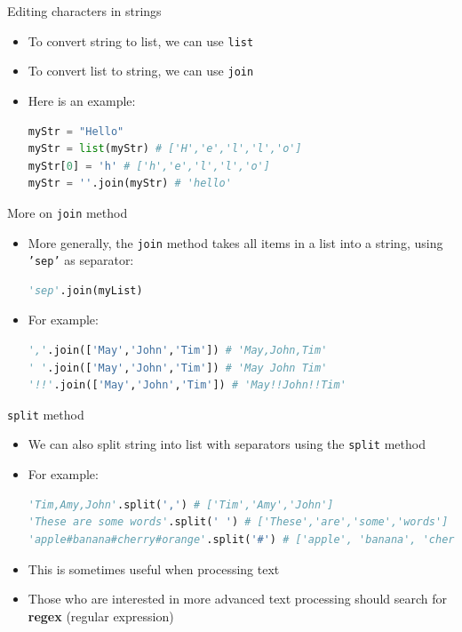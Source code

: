\documentclass[10pt,xcolor={table,dvipsnames},t]{beamer}
\begin{document}
\begin{frame}[fragile]{Editing characters in strings}
  \begin{itemize}
    \item To convert string to list, we can use \texttt{list}
    \item To convert list to string, we can use \texttt{join}
    \item Here is an example:
\begin{lstlisting}[language=python]
myStr = "Hello"
myStr = list(myStr) # ['H','e','l','l','o']
myStr[0] = 'h' # ['h','e','l','l','o']
myStr = ''.join(myStr) # 'hello'
\end{lstlisting}
  \end{itemize}
\end{frame}

\begin{frame}[fragile]{More on \texttt{join} method}
  \begin{itemize}
    \item More generally, the \texttt{join} method takes all items in a list into a string, using \texttt{'sep'} as separator:
\begin{lstlisting}[language=python]
'sep'.join(myList)
\end{lstlisting}
    \item For example: 
\begin{lstlisting}[language=python]
','.join(['May','John','Tim']) # 'May,John,Tim'
' '.join(['May','John','Tim']) # 'May John Tim'
'!!'.join(['May','John','Tim']) # 'May!!John!!Tim'
\end{lstlisting}
  \end{itemize}
\end{frame}


\begin{frame}[fragile]{\texttt{split} method}
  \begin{itemize}
    \item We can also split string into list with separators using the \texttt{split} method
    \item For example: 
\begin{lstlisting}[language=python]
'Tim,Amy,John'.split(',') # ['Tim','Amy','John']
'These are some words'.split(' ') # ['These','are','some','words']
'apple#banana#cherry#orange'.split('#') # ['apple', 'banana', 'cherry', 'orange']
\end{lstlisting}
    \item This is sometimes useful when processing text 
    \item Those who are interested in more advanced text processing should search for \textbf{regex} (regular expression)
  \end{itemize}
\end{frame}
\end{document}

